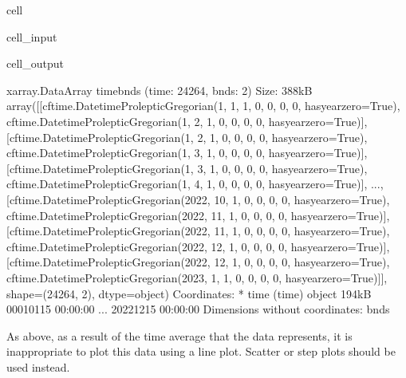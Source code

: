 \documentclass[letterpaper,10pt,english]{jupyterBook}
\begin{document}
\begin{sphinxuseclass}{cell}\begin{sphinxVerbatimInput}

\begin{sphinxuseclass}{cell_input}
\begin{sphinxVerbatim}[commandchars=\\\{\}]
\PYG{p}{[}\PYG{p}{]}
\end{sphinxVerbatim}

\end{sphinxuseclass}\end{sphinxVerbatimInput}
\begin{sphinxVerbatimOutput}

\begin{sphinxuseclass}{cell_output}
\begin{sphinxVerbatim}[commandchars=\\\{\}]
\PYGZlt{}xarray.DataArray \PYGZsq{}time\PYGZus{}bnds\PYGZsq{} (time: 24264, bnds: 2)\PYGZgt{} Size: 388kB
array([[cftime.DatetimeProlepticGregorian(1, 1, 1, 0, 0, 0, 0, has\PYGZus{}year\PYGZus{}zero=True),
        cftime.DatetimeProlepticGregorian(1, 2, 1, 0, 0, 0, 0, has\PYGZus{}year\PYGZus{}zero=True)],
       [cftime.DatetimeProlepticGregorian(1, 2, 1, 0, 0, 0, 0, has\PYGZus{}year\PYGZus{}zero=True),
        cftime.DatetimeProlepticGregorian(1, 3, 1, 0, 0, 0, 0, has\PYGZus{}year\PYGZus{}zero=True)],
       [cftime.DatetimeProlepticGregorian(1, 3, 1, 0, 0, 0, 0, has\PYGZus{}year\PYGZus{}zero=True),
        cftime.DatetimeProlepticGregorian(1, 4, 1, 0, 0, 0, 0, has\PYGZus{}year\PYGZus{}zero=True)],
       ...,
       [cftime.DatetimeProlepticGregorian(2022, 10, 1, 0, 0, 0, 0, has\PYGZus{}year\PYGZus{}zero=True),
        cftime.DatetimeProlepticGregorian(2022, 11, 1, 0, 0, 0, 0, has\PYGZus{}year\PYGZus{}zero=True)],
       [cftime.DatetimeProlepticGregorian(2022, 11, 1, 0, 0, 0, 0, has\PYGZus{}year\PYGZus{}zero=True),
        cftime.DatetimeProlepticGregorian(2022, 12, 1, 0, 0, 0, 0, has\PYGZus{}year\PYGZus{}zero=True)],
       [cftime.DatetimeProlepticGregorian(2022, 12, 1, 0, 0, 0, 0, has\PYGZus{}year\PYGZus{}zero=True),
        cftime.DatetimeProlepticGregorian(2023, 1, 1, 0, 0, 0, 0, has\PYGZus{}year\PYGZus{}zero=True)]],
      shape=(24264, 2), dtype=object)
Coordinates:
  * time     (time) object 194kB 0001\PYGZhy{}01\PYGZhy{}15 00:00:00 ... 2022\PYGZhy{}12\PYGZhy{}15 00:00:00
Dimensions without coordinates: bnds
\end{sphinxVerbatim}

\end{sphinxuseclass}\end{sphinxVerbatimOutput}

\end{sphinxuseclass}
\sphinxAtStartPar
As above, as a result of the time average that the data represents,
it is inappropriate to plot this data using a line plot.
Scatter or step plots should be used instead.
\end{document}
